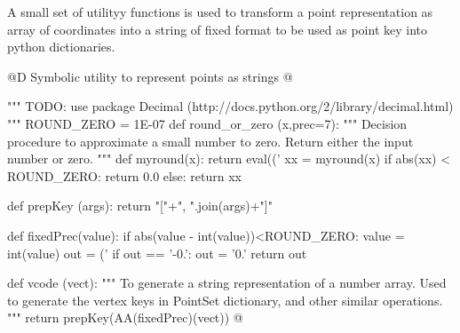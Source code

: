 \documentclass[11pt,oneside]{article}	%
\begin{document}
A small set of utilityy functions is used to transform a point representation as array of coordinates into a string of fixed format to be used as point key into python dictionaries.

@D Symbolic utility to represent points as strings
@{""" TODO: use package Decimal (http://docs.python.org/2/library/decimal.html) """
ROUND_ZERO = 1E-07
def round_or_zero (x,prec=7):
	"""
	Decision procedure to approximate a small number to zero.
	Return either the input number or zero.
	"""
	def myround(x):
		return eval(('%
	xx = myround(x)
	if abs(xx) < ROUND_ZERO: return 0.0
	else: return xx

def prepKey (args): return "["+", ".join(args)+"]"

def fixedPrec(value):
	if abs(value - int(value))<ROUND_ZERO: value = int(value)
	out = ('%
	if out == '-0.': out = '0.'
	return out
	
def vcode (vect): 
	"""
	To generate a string representation of a number array.
	Used to generate the vertex keys in PointSet dictionary, and other similar operations.
	"""
	return prepKey(AA(fixedPrec)(vect))
@}




\end{document}
